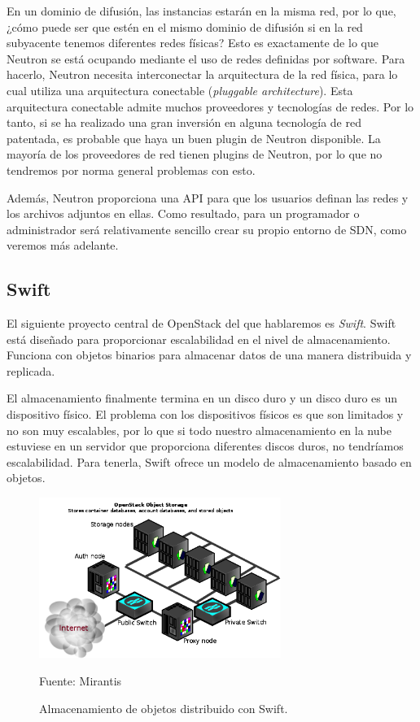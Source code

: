 En un dominio de difusión, las instancias estarán en la misma red, por lo que, ¿cómo puede ser que estén en el mismo dominio de difusión si en la red subyacente tenemos diferentes redes físicas? Esto es exactamente de lo que Neutron se está ocupando mediante el uso de redes definidas por software. Para hacerlo, Neutron necesita interconectar la arquitectura de la red física, para lo cual utiliza una arquitectura conectable (\textit{pluggable architecture}). Esta arquitectura conectable admite muchos proveedores y tecnologías de redes. Por lo tanto, si se ha realizado una gran inversión en alguna tecnología de red patentada, es probable que haya un buen plugin de Neutron disponible. La mayoría de los proveedores de red tienen plugins de Neutron, por lo que no tendremos por norma general problemas con esto.

Además, Neutron proporciona una API para que los usuarios definan las redes y los archivos adjuntos en ellas. Como resultado, para un programador o administrador será relativamente sencillo crear su propio entorno de SDN, como veremos más adelante.

\subsection{Swift}
El siguiente proyecto central de OpenStack del que hablaremos es \textit{Swift}. Swift está diseñado para proporcionar escalabilidad en el nivel de almacenamiento. Funciona con objetos binarios para almacenar datos de una manera distribuida y replicada. \cite{noauthor_swift_nodate}

El almacenamiento finalmente termina en un disco duro y un disco duro es un dispositivo físico. El problema con los dispositivos físicos es que son limitados y no son muy escalables, por lo que si todo nuestro almacenamiento en la nube estuviese en un servidor que proporciona diferentes discos duros, no tendríamos escalabilidad. Para tenerla, Swift ofrece un modelo de almacenamiento basado en objetos.

\begin{figure}
    \centering
    \includegraphics[width=0.7\textwidth]{imagenes/capitulo2/swift_storage.png}
    \caption{Almacenamiento de objetos distribuido con Swift.}
    \footnotesize{Fuente: Mirantis}
	\vspace{0.3cm}
    \label{Swift Storage}
\end{figure}

